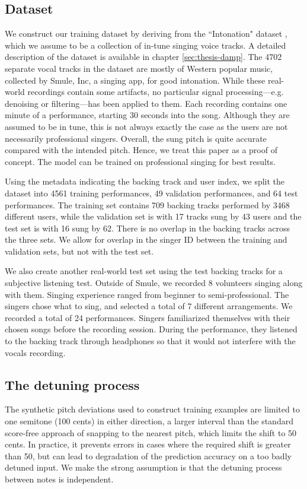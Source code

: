 \subsection{Dataset}
\label{sec:dataset-autotune}
We construct our training dataset by deriving from the ``Intonation" dataset \cite{wager2018intonation}, which we assume to be a collection of in-tune singing voice tracks. A detailed description of the dataset is available in chapter \ref{sec:thesis-damp}. The 4702 separate vocal tracks in the dataset are mostly of Western popular music, collected by Smule, Inc, a singing app, for good intonation. While these real-world recordings contain some artifacts, no particular signal processing---e.g. denoising or filtering---has been applied to them. Each recording contains one minute of a performance, starting 30 seconds into the song. Although they are assumed to be in tune, this is not always exactly the case as the users are not necessarily professional singers. Overall, the sung pitch is quite accurate compared with the intended pitch. Hence, we treat this paper as a proof of concept. The model can be trained on professional singing for best results.

Using the metadata indicating the backing track and user index, we split the dataset into 4561 training performances, 49 validation performances, and 64 test performances. The training set contains 709 backing tracks performed by 3468 different users, while the validation set is with 17 tracks sung by 43 users and the test set is with 16 sung by 62. There is no overlap in the backing tracks across the three sets. We allow for overlap in the singer ID between the training and validation sets, but not with the test set. 

We also create another real-world test set using the test backing tracks for a subjective listening test. Outside of Smule, we recorded 8 volunteers singing along with them. Singing experience ranged from beginner to semi-professional. The singers chose what to sing, and selected a total of 7 different arrangements. We recorded a total of 24 performances. Singers familiarized themselves with their chosen songs before the recording session. During the performance, they listened to the backing track through headphones so that it would not interfere with the vocals recording. 
\subsection{The detuning process}
The synthetic pitch deviations used to construct training examples are limited to one semitone (100 cents) in either direction, a larger interval than the standard score-free approach of snapping to the nearest pitch, which limits the shift to 50 cents. In practice, it prevents errors in cases where the required shift is greater than 50, but can lead to degradation of the prediction accuracy on a too badly detuned input. We make the strong assumption is that the detuning process between notes is independent.

